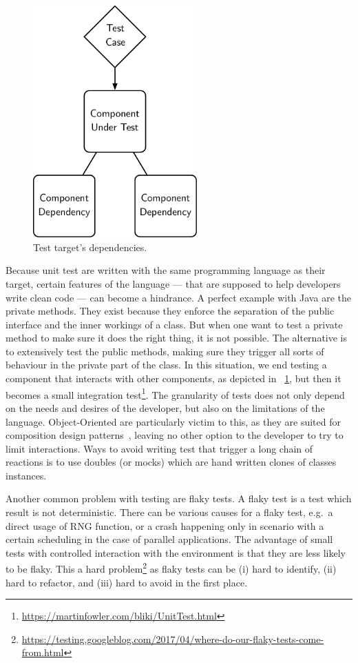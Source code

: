 \documentclass[11pt]{sdm_internship}
\newcommand{\rephrase}[1]{\colorbox{BlueViolet!60}{\textcolor{white}{\textbf{$\sim$#1}}}}
\theoremstyle{definition}
\begin{document}
\begin{figure}
  \centering
  \includegraphics[width=17em]{component_dependency}
  \caption{Test target's dependencies.}%
  \label{fig:component_dependency}
\end{figure}

Because unit test are written with the same programming language as their target, certain features of the language --- that are supposed to help developers write clean code --- can become a hindrance.
A perfect example with Java are the private methods.
They exist because they enforce the separation of the public interface and the inner workings of a class.
But when one want to test a private method to make sure it does the right thing, it is not possible.
The alternative is to extensively test the public methods, making sure they trigger all sorts of behaviour in the private part of the class.
In this situation, we end testing a component that interacts with other components, as depicted in \figurename~\ref{fig:component_dependency}, but then it becomes a small integration test\footnote{\url{https://martinfowler.com/bliki/UnitTest.html}}.
The granularity of tests does not only depend on the needs and desires of the developer, but also on the limitations of the language.
Object-Oriented are particularly victim to this, as they are suited for composition design patterns~\cite{wolfgang1994design}, leaving no other option to the developer to try to limit interactions.
Ways to avoid writing test that trigger a long chain of reactions is to use doubles (or mocks) which are hand written clones of classes instances.\rephrase{}

Another common problem with testing are flaky tests.
A flaky test is a test which result is not deterministic.
There can be various causes for a flaky test, e.g.\ a direct usage of RNG function, or a crash happening only in scenario with a certain scheduling in the case of parallel applications.
The advantage of small tests with controlled interaction with the environment is that they are less likely to be flaky.
This a hard problem\footnote{\url{https://testing.googleblog.com/2017/04/where-do-our-flaky-tests-come-from.html}} as flaky tests can be (i) hard to identify, (ii) hard to refactor, and (iii) hard to avoid in the first place.
\end{document}
